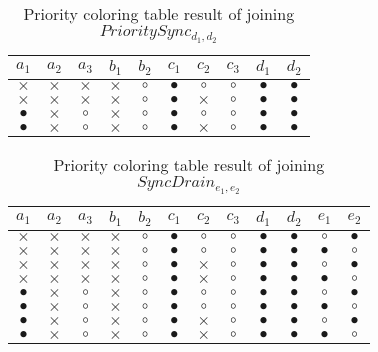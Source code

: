 \begin{BehExample}
\begin{table}
\begin{tabular}{|c|c|c|c|c|c|c|c|c|c|}
  \hline
   $a_1$ & $a_2$ & $a_3$ & $b_1$ & $b_2$ & $c_1$ & $c_2$ & $c_3$ & $d_1$ & $d_2$ \\ 
  \hline
  $\times$ & $\times$ & $\times$ & $\times$ & $\circ$ & $\bullet$ & $\circ$ & $\circ$ & $\bullet$ & $\bullet$ \\ 
  \hline
  $\times$ & $\times$ & $\times$ & $\times$ & $\circ$ & $\bullet$ & $\times$ & $\circ$ & $\bullet$ & $\bullet$ \\ 
  \hline
  $\bullet$ & $\times$ & $\circ$ & $\times$ & $\circ$ & $\bullet$ & $\circ$ & $\circ$ & $\bullet$ & $\bullet$ \\ 
  \hline
  $\bullet$ & $\times$ & $\circ$ & $\times$ & $\circ$ & $\bullet$ & $\times$ & $\circ$ & $\bullet$ & $\bullet$ \\ 
  \hline
\end{tabular}
\caption{Priority coloring table result of joining $PrioritySync_{d_1, d_2}$}
\label{tab:j5}
\end{table}

\begin{table}
\begin{tabular}{|c|c|c|c|c|c|c|c|c|c|c|c|}
  \hline
$a_1$ & $a_2$ & $a_3$ & $b_1$ & $b_2$ & $c_1$ & $c_2$ & $c_3$ & $d_1$ & $d_2$ & $e_1$ & $e_2$ \\ 
\hline
$\times$ & $\times$ & $\times$ & $\times$ & $\circ$ & $\bullet$ & $\circ$ & $\circ$ & $\bullet$ & $\bullet$ & $\circ$ & $\bullet$ \\ 
\hline
$\times$ & $\times$ & $\times$ & $\times$ & $\circ$ & $\bullet$ & $\circ$ & $\circ$ & $\bullet$ & $\bullet$ & $\bullet$ & $\circ$ \\ 
\hline
$\times$ & $\times$ & $\times$ & $\times$ & $\circ$ & $\bullet$ & $\times$ & $\circ$ & $\bullet$ & $\bullet$ & $\circ$ & $\bullet$ \\ 
\hline
$\times$ & $\times$ & $\times$ & $\times$ & $\circ$ & $\bullet$ & $\times$ & $\circ$ & $\bullet$ & $\bullet$ & $\bullet$ & $\circ$ \\ 
\hline
$\bullet$ & $\times$ & $\circ$ & $\times$ & $\circ$ & $\bullet$ & $\circ$ & $\circ$ & $\bullet$ & $\bullet$ & $\circ$ & $\bullet$ \\ 
\hline
$\bullet$ & $\times$ & $\circ$ & $\times$ & $\circ$ & $\bullet$ & $\circ$ & $\circ$ & $\bullet$ & $\bullet$ & $\bullet$ & $\circ$ \\ 
\hline
$\bullet$ & $\times$ & $\circ$ & $\times$ & $\circ$ & $\bullet$ & $\times$ & $\circ$ & $\bullet$ & $\bullet$ & $\circ$ & $\bullet$ \\ 
\hline
$\bullet$ & $\times$ & $\circ$ & $\times$ & $\circ$ & $\bullet$ & $\times$ & $\circ$ & $\bullet$ & $\bullet$ & $\bullet$ & $\circ$ \\ 
\hline
\end{tabular}
\caption{Priority coloring table result of joining $SyncDrain_{e_1, e_2}$}
\label{tab:j6}
\end{table}


\end{BehExample}
